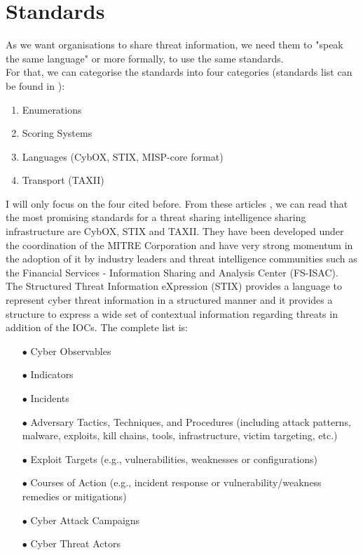 \documentclass{eplmastersthesis}
\begin{document}
\section{Standards}
As we want organisations to share threat information, we need them to "speak the same language" or more formally, to use the same standards.\\
For that, we can categorise the standards into four categories (standards list can be found in \cite{AwesomeTreat, mohaisen2017rethinking}):
\begin{enumerate}
\item Enumerations
\item Scoring Systems
\item Languages (CybOX, STIX, MISP-core format)
\item Transport (TAXII)
\end{enumerate}

I will only focus on the four cited before. From these articles \cite{fransen2015cyber, sauerwein2017threat}, we can read that the most promising standards for a threat sharing intelligence sharing infrastructure are CybOX, STIX and TAXII. They have been developed under the coordination of the MITRE Corporation and have very strong momentum in the adoption of it by industry leaders and threat intelligence communities such as the Financial Services - Information Sharing and Analysis Center (FS-ISAC).\\
The  Structured Threat Information eXpression (STIX) \cite{barnum2012standardizing} provides a language to represent cyber threat information in a structured manner and it provides a structure to express a wide set of contextual information regarding threats in addition of the IOCs. The complete list is:

\begin{itemize}
\item[$\bullet$] Cyber Observables
\item[$\bullet$] Indicators
\item[$\bullet$] Incidents
\item[$\bullet$] Adversary Tactics, Techniques, and Procedures (including attack patterns, malware, exploits, kill
chains, tools, infrastructure, victim targeting, etc.)
\item[$\bullet$] Exploit Targets (e.g., vulnerabilities, weaknesses or configurations)
\item[$\bullet$] Courses of Action (e.g., incident response or vulnerability/weakness remedies or mitigations)
\item[$\bullet$] Cyber Attack Campaigns
\item[$\bullet$] Cyber Threat Actors
\end{itemize}
\end{document}
